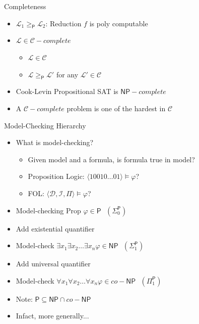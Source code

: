 \documentclass[usenames,dvipsnames]{beamer}
\newcommand{\cC}{\mathcal{C}}
\newcommand{\cD}{\mathcal{D}}
\newcommand{\cI}{\mathcal{I}}
\newcommand{\cL}{\mathcal{L}}
\newcommand\ldiaarg[1]{\langle#1\rangle}
\newcommand{\PTime}{\mathsf{P}}
\newcommand{\NP}{\mathsf{NP}}
\begin{document}
\begin{frame}{Completeness}
    \begin{itemize}
        \item $\cL_1\geq_{\PTime}\cL_2$: Reduction $f$ is poly computable
        \item $\cL\in\cC-complete$
        \begin{itemize}
            \item $\cL\in\cC$
            \item $\cL\geq_\PTime\cL'$ for any $\cL'\in\cC$
        \end{itemize}
        \item[] 
        \begin{block}{Cook-Levin}
        Propositional SAT is $\NP-complete$    
        \end{block}

        \item A $\cC-complete$ problem is one of the hardest in $\cC$
    \end{itemize}
\end{frame}

\begin{frame}{Model-Checking Hierarchy}
    \begin{itemize}
        \item What is model-checking?
        \begin{itemize}
            \item Given model and a formula, is formula true in model?
            \item Proposition Logic: $\ldiaarg{10010\ldots01}\vDash\varphi$?
            \item FOL: $\ldiaarg{\cD,\cI,\Pi}\vDash\varphi$?
        \end{itemize}
        \item Model-checking Prop $\varphi\in\PTime~~~(\Sigma^\PTime_0)$
        \item Add existential quantifier
        \item[] Model-check $\exists x_1\exists x_2\ldots\exists x_n\varphi\in\NP~~~(\Sigma^\PTime_1)$
        \item Add universal quantifier
        \item[] Model-check $\forall x_1\forall x_2\ldots\forall x_n\varphi\in co-\NP~~~(\Pi^\PTime_1)$
        \item Note: $\PTime\subseteq \NP\cap co-\NP$
        \item[] Infact, more generally...
    \end{itemize}
\end{frame}
\end{document}
